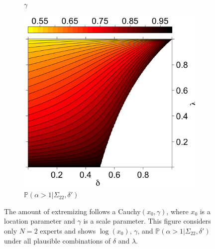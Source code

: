 \documentclass[11pt]{article}
\renewcommand{\P}{\mathbb{P}}
\theoremstyle{definition}
\theoremstyle{definition}
\begin{document}
\begin{figure}[t]
\begin{subfigure}[b]{0.33\textwidth}
\caption{$\gamma$}
\label{gammaOracle}
        \end{subfigure}
\hspace{-1.3em}
        \begin{subfigure}[b]{0.33\textwidth}
                \includegraphics[width=1.07\textwidth, height = \textwidth]{Probs}
\caption{$\P(\alpha > 1 | \Sigma_{22}, \delta')$}
\label{probOracle}
        \end{subfigure}

        \caption{ The amount of extremizing follows a Cauchy$(x_0, \gamma)$, where $x_0$ is a location parameter and $\gamma$ is a scale parameter. This figure considers only $N = 2$ experts and shows $\log(x_0)$, $\gamma$, and $\P(\alpha > 1 | \Sigma_{22}, \delta')$ under all plausible combinations of $\delta$ and $\lambda$.}
        \label{LevelplotsOracle}
\end{figure}
 
\end{document}
